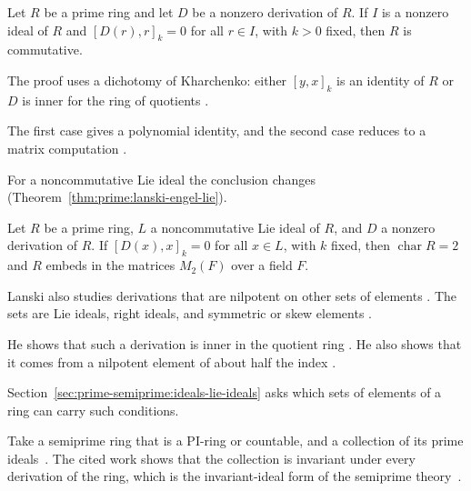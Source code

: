 \begin{theorem}\label{thm:prime:lanski-engel}
Let $R$ be a prime ring and let $D$ be a nonzero derivation of $R$. If $I$ is a
nonzero ideal of $R$ and $[D(r),r]_k=0$ for all $r\in I$, with $k>0$ fixed, then
$R$ is commutative.
\end{theorem}

The proof uses a dichotomy of Kharchenko: either $[y,x]_k$ is an identity of
$R$ or $D$ is inner for the ring of quotients \cite[p.~732]{Lanski1993}.

The first case gives a polynomial identity, and the second case reduces to a
matrix computation \cite[p.~732]{Lanski1993}.

For a noncommutative Lie ideal the conclusion changes
(Theorem~\ref{thm:prime:lanski-engel-lie}).

\begin{theorem}\label{thm:prime:lanski-engel-lie}
Let $R$ be a prime ring, $L$ a noncommutative Lie ideal of $R$, and $D$ a nonzero
derivation of $R$. If $[D(x),x]_k=0$ for all $x\in L$, with $k$ fixed, then
$\operatorname{char}R=2$ and $R$ embeds in the matrices $M_2(F)$ over a field $F$.
\end{theorem}

Lanski also studies derivations that are nilpotent on other sets of elements
\cite[p.~1427]{Lanski1992}. The sets are Lie ideals, right ideals, and
symmetric or skew elements \cite[p.~1427]{Lanski1992}.

He shows that such a derivation is inner in the quotient ring
\cite[p.~1427]{Lanski1992}. He also shows that it comes from a nilpotent
element of about half the index \cite[p.~1427]{Lanski1992}.

Section~\ref{sec:prime-semiprime:ideals-lie-ideals} asks which sets of
elements of a ring can carry such conditions.

Take a semiprime ring that is a PI-ring or countable, and a collection of its
prime ideals~\cite{WlSemiprimeRingsWithPrimeIdealsI2018}. The cited work shows that the collection is invariant under
every derivation of the ring, which is the invariant-ideal form of the
semiprime theory~\cite{WlSemiprimeRingsWithPrimeIdealsI2018}.
